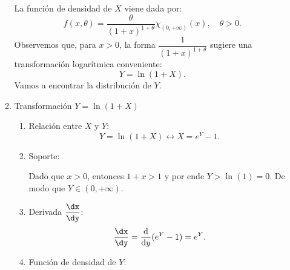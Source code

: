 \begin{enumerate}[label=\color{red}\textbf{\arabic*)}]
\begin{enumerate}[label=\arabic*)]
        La función de densidad de  $X$ viene dada por:  \[
        f(x,\theta)=\dfrac{\theta}{(1+x)^{1+\theta}}\chi_{(0,+\infty)}(x),\quad \theta>0.
        \] 
        Observemos que, para $x>0$, la forma  $\dfrac{1}{(1+x)^{1+\theta}}$ sugiere una transformación logarítmica conveniente: \[
        Y=\ln(1+X).
        \] 
        Vamos a encontrar la distribución de $Y$.
    \item Transformación  $Y=\ln(1+X)$
        \begin{enumerate}[label=\arabic*)]
            \item Relación entre $X$ y $Y$: \[
            Y=\ln(1+X)\longleftrightarrow X=e^{Y}-1. 
            \] 
        \item Soporte:

            Dado que $x>0$, entonces  $1+x>1$ y por ende  $Y>\ln(1)=0$. De modo que $Y\in (0,+\infty)$.
        \item Derivada $\dfrac{\dx}{\dy } $: \[
        \dfrac{\dx }{\dy }=\dfrac{\mathrm{d}}{\mathrm{d}y}(e^{Y}-1 )=e^{Y}. 
        \] 
    \item Función de densidad de $Y$: 


\end{enumerate}
\end{enumerate}
\end{enumerate}
